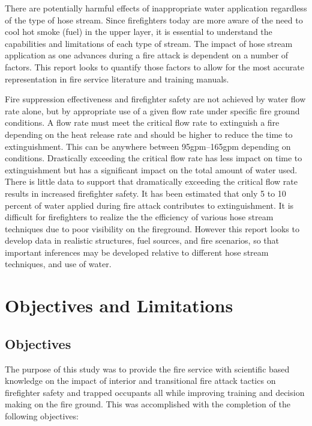 \documentclass[12pt,oneside]{book}
\begin{document}
There are potentially harmful effects of inappropriate water application regardless of the type of hose stream. Since firefighters today are more aware of the need to cool hot smoke (fuel) in the upper layer, it is essential to understand the capabilities and limitations of each type of stream. The impact of hose stream application as one advances during a fire attack is dependent on a number of factors. This report looks to quantify those factors to allow for the most accurate representation in fire service literature and training manuals. 

Fire suppression effectiveness and firefighter safety are not achieved by water flow rate alone, but by appropriate use of a given flow rate under specific fire ground conditions. A flow rate must meet the critical flow rate to extinguish a fire depending on the heat release rate and should be higher to reduce the time to extinguishment. This can be anywhere between 95gpm--165gpm depending on conditions. Drastically exceeding the critical flow rate has less impact on time to extinguishment but has a significant impact on the total amount of water used. There is little data to support that dramatically exceeding the critical flow rate results in increased firefighter safety. It has been estimated that only 5 to 10 percent of water applied during fire attack contributes to extinguishment. It is difficult for firefighters to realize the the efficiency of various hose stream techniques due to poor visibility on the fireground. However this report looks to develop data in realistic structures, fuel sources, and fire scenarios, so that important inferences may be developed relative to different hose stream techniques, and use of water.

\clearpage

\chapter{Objectives and Limitations}

\section {Objectives}

The purpose of this study was to provide the fire service with scientific based knowledge on the impact of interior and transitional fire attack tactics on firefighter safety and trapped occupants all while improving training and decision making on the fire ground. This was accomplished with the completion of the following objectives:
\end{document}
